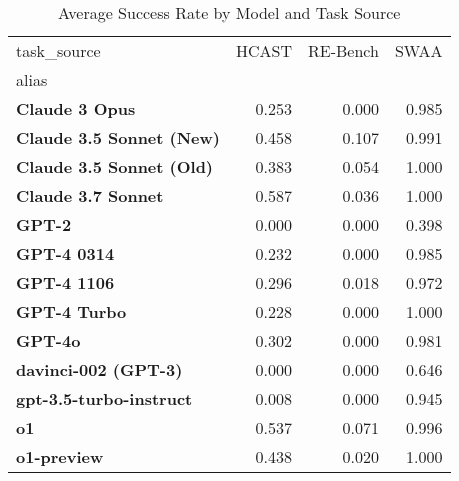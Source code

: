 \begin{table}[htbp]
\caption{Average Success Rate by Model and Task Source}
\label{tab:model_task_success}
\begin{tabular}{lrrr}
\toprule
task_source & HCAST & RE-Bench & SWAA \\
alias &  &  &  \\
\midrule
\textbf{Claude 3 Opus} & 0.253 & 0.000 & 0.985 \\
\textbf{Claude 3.5 Sonnet (New)} & 0.458 & 0.107 & 0.991 \\
\textbf{Claude 3.5 Sonnet (Old)} & 0.383 & 0.054 & 1.000 \\
\textbf{Claude 3.7 Sonnet} & 0.587 & 0.036 & 1.000 \\
\textbf{GPT-2} & 0.000 & 0.000 & 0.398 \\
\textbf{GPT-4 0314} & 0.232 & 0.000 & 0.985 \\
\textbf{GPT-4 1106} & 0.296 & 0.018 & 0.972 \\
\textbf{GPT-4 Turbo} & 0.228 & 0.000 & 1.000 \\
\textbf{GPT-4o} & 0.302 & 0.000 & 0.981 \\
\textbf{davinci-002 (GPT-3)} & 0.000 & 0.000 & 0.646 \\
\textbf{gpt-3.5-turbo-instruct} & 0.008 & 0.000 & 0.945 \\
\textbf{o1} & 0.537 & 0.071 & 0.996 \\
\textbf{o1-preview} & 0.438 & 0.020 & 1.000 \\
\bottomrule
\end{tabular}
\end{table}
